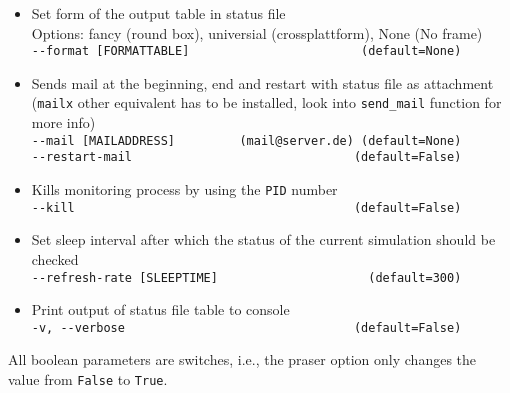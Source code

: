 \begin{itemize}
    \item Set form of the output table in status file\\
          Options: fancy (round box), universial (crossplattform), None (No frame)\\
          \texttt{-\/-format [FORMATTABLE]~~~~~~~~~~~~~~~~~~~~~~~~(default=None)}
    \item Sends mail at the beginning, end and restart with status file as attachment\\
          (\texttt{mailx} other equivalent has to be installed, look into \texttt{send\_mail} function for more info)\\
          \texttt{-\/-mail [MAILADDRESS]~~~~~~~~~(mail@server.de)~(default=None)}\\
          \texttt{-\/-restart-mail ~~~~~~~~~~~~~~~~~~~~~~~~~~~~~~(default=False)}
    \item Kills monitoring process by using the \texttt{PID} number\\
          \texttt{-\/-kill~~~~~~~~~~~~~~~~~~~~~~~~~~~~~~~~~~~~~~~(default=False)}
    \item Set sleep interval after which the status of the current simulation should be checked\\
          \texttt{-\/-refresh-rate [SLEEPTIME]~~~~~~~~~~~~~~~~~~~~~(default=300)}
    \item Print output of status file table to console\\
          \texttt{-v, -\/-verbose~~~~~~~~~~~~~~~~~~~~~~~~~~~~~~~\,(default=False)}
\end{itemize}
All boolean parameters are switches, i.e., the praser option only changes the value from \texttt{False} to \texttt{True}.

